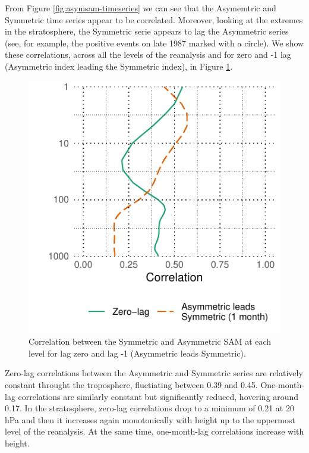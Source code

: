 \documentclass[twocol]{ametsocV5}
\begin{document}
From Figure \ref{fig:asymsam-timeseries} we can see that the Asymemtric
and Symmetric time series appear to be correlated. Moreover, looking at
the extremes in the stratosphere, the Symmetric serie appears to lag the
Asymmetric series (see, for example, the positive events on late 1987
marked with a circle). We show these correlations, across all the levels
of the reanalysis and for zero and -1 lag (Asymmetric index leading the
Symmetric index), in Figure \ref{fig:cor-lev}.

\begin{figure}
\includegraphics{cor-lev-1} \caption[Correlation between the Symmetric and Asymmetric SAM at each level for lag zero and lag -1 (Asymmetric leads Symmetric)]{Correlation between the Symmetric and Asymmetric SAM at each level for lag zero and lag -1 (Asymmetric leads Symmetric).}\label{fig:cor-lev}
\end{figure}

Zero-lag correlations between the Asymmetric and Symmetric series are
relatively constant throught the troposphere, fluctiating between 0.39
and 0.45. One-month-lag correlations are similarly constant but
significantly reduced, hovering around 0.17. In the stratosphere,
zero-lag correlations drop to a minimum of 0.21 at 20 hPa and then it
increases again monotonically with height up to the uppermost level of
the reanalysis. At the same time, one-month-lag correlations increase
with height.
\end{document}
